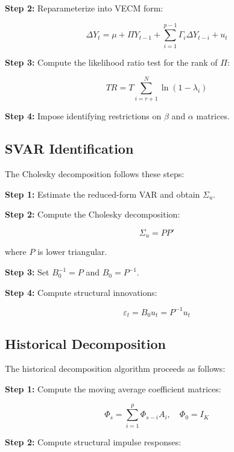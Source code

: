 \documentclass[11pt,a4paper]{article}
\begin{document}
\textbf{Step 2:} Reparameterize into VECM form:

\begin{equation}
\Delta Y_t = \mu + \Pi Y_{t-1} + \sum_{i=1}^{p-1} \Gamma_i \Delta Y_{t-i} + u_t
\end{equation}

\textbf{Step 3:} Compute the likelihood ratio test for the rank of $\Pi$:

\begin{equation}
TR = T\sum_{i=r+1}^{N} \ln(1 - \lambda_i)
\end{equation}

\textbf{Step 4:} Impose identifying restrictions on $\beta$ and $\alpha$ matrices.

\subsection{SVAR Identification}

The Cholesky decomposition follows these steps:

\textbf{Step 1:} Estimate the reduced-form VAR and obtain $\Sigma_u$.

\textbf{Step 2:} Compute the Cholesky decomposition:

\begin{equation}
\Sigma_u = PP'
\end{equation}

where $P$ is lower triangular.

\textbf{Step 3:} Set $B_0^{-1} = P$ and $B_0 = P^{-1}$.

\textbf{Step 4:} Compute structural innovations:

\begin{equation}
\varepsilon_t = B_0 u_t = P^{-1} u_t
\end{equation}

\subsection{Historical Decomposition}

The historical decomposition algorithm proceeds as follows:

\textbf{Step 1:} Compute the moving average coefficient matrices:

\begin{equation}
\Phi_s = \sum_{i=1}^{p} \Phi_{s-i} A_i, \quad \Phi_0 = I_K
\end{equation}

\textbf{Step 2:} Compute structural impulse responses:
\end{document}
